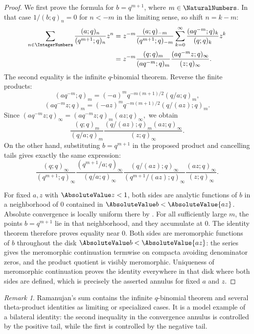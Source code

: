 \documentclass[11pt,a4paper,oneside,openany]{book}
\theoremstyle{definition}
\theoremstyle{remark}
\newtheorem{remark}[remark]{Remark}
\begin{document}
\begin{proof}
We first prove the formula for $b=q^{m+1}$, where $m\in\NaturalNumbers$.  In that case $1/(b;q)_n=0$ for $n<-m$ in the limiting sense, so shift $n=k-m$:
\begin{align*}
 \sum_{n\in\IntegerNumbers}\frac{(a;q)_n}{(q^{m+1};q)_n}z^n
 &=z^{-m}\frac{(a;q)_{-m}}{(q^{m+1};q)_{-m}}
 \sum_{k=0}^{\infty}\frac{(aq^{-m};q)_k}{(q;q)_k}z^k\\
 &=z^{-m}\frac{(q;q)_m}{(aq^{-m};q)_m}
 \frac{(aq^{-m}z;q)_\infty}{(z;q)_\infty}.
\end{align*}
The second equality is the infinite $q$-binomial theorem.  Reverse the finite products:
\[
 (aq^{-m};q)_m=(-a)^mq^{-m(m+1)/2}(q/a;q)_m,
\]
\[
 (aq^{-m}z;q)_m=(-az)^mq^{-m(m+1)/2}(q/(az);q)_m.
\]
Since
\(
 (aq^{-m}z;q)_\infty=(aq^{-m}z;q)_m(az;q)_\infty,
\)
we obtain
\[
 \frac{(q;q)_m}{(q/a;q)_m}
 \frac{(q/(az);q)_m(az;q)_\infty}{(z;q)_\infty}.
\]
On the other hand, substituting $b=q^{m+1}$ in the proposed product and cancelling tails gives exactly the same expression:
\[
 \frac{(q;q)_\infty}{(q^{m+1};q)_\infty}
 \frac{(q^{m+1}/a;q)_\infty}{(q/a;q)_\infty}
 \frac{(q/(az);q)_\infty}{(q^{m+1}/(az);q)_\infty}
 \frac{(az;q)_\infty}{(z;q)_\infty}.
\]

For fixed $a,z$ with $\AbsoluteValue z<1$, both sides are analytic functions of $b$ in a neighborhood of $0$ contained in $\AbsoluteValue b<\AbsoluteValue{az}$.  Absolute convergence is locally uniform there by .  For all sufficiently large $m$, the points $b=q^{m+1}$ lie in that neighborhood, and they accumulate at $0$.  The identity theorem therefore proves equality near $0$.  Both sides are meromorphic functions of $b$ throughout the disk $\AbsoluteValue b<\AbsoluteValue{az}$: the series gives the meromorphic continuation termwise on compacta avoiding denominator zeros, and the product quotient is visibly meromorphic.  Uniqueness of meromorphic continuation proves the identity everywhere in that disk where both sides are defined, which is precisely the asserted annulus for fixed $a$ and $z$.
\end{proof}

\begin{remark}
Ramanujan's sum contains the infinite $q$-binomial theorem and several theta-product identities as limiting or specialized cases.  It is a model example of a bilateral identity: the second inequality in the convergence annulus is controlled by the positive tail, while the first is controlled by the negative tail.
\end{remark}
\end{document}
